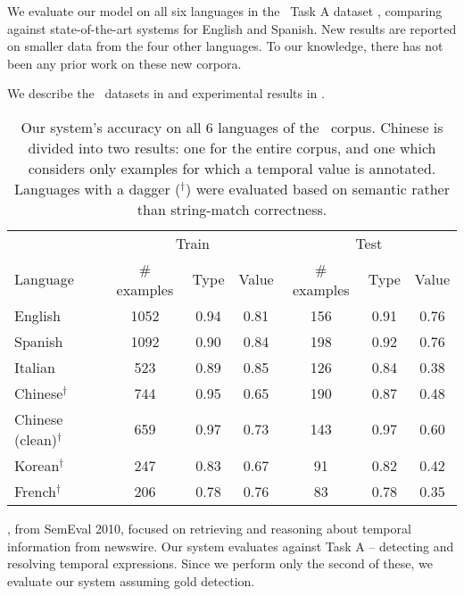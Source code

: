 We evaluate our model on all six languages in the \tempeval\ Task A dataset
  \cite{key:2010verhagen-tempeval}, comparing against state-of-the-art
  systems for English and Spanish.
New results are reported on smaller data from the four other languages.
To our knowledge, there has not been any prior work on these new corpora.

We describe the \tempeval\ datasets in  and experimental
  results in .


\begin{table*}[ht]
	\begin{center}
	\begin{tabular}{|l|c|c|c|c|c|c|}
		\hline
		       & \multicolumn{3}{c|}{Train} & \multicolumn{3}{c|}{Test} \\
		Language & \# examples & Type & Value  & \# examples & Type & Value \\
		\hline
		\hline
		English                        & 1052 & 0.94 & 0.81  & 156 & 0.91 & 0.76 \\
		Spanish                        & 1092 & 0.90 & 0.84  & 198 & 0.92 & 0.76 \\
		Italian                        & 523  & 0.89 & 0.85  & 126 & 0.84 & 0.38 \\
		Chinese$^\dagger$              & 744  & 0.95 & 0.65  & 190 & 0.87 & 0.48 \\
		Chinese (clean)$^\dagger$      & 659  & 0.97 & 0.73  & 143 & 0.97 & 0.60 \\
		Korean$^\dagger$               & 247  & 0.83 & 0.67  & 91  & 0.82 & 0.42 \\
		French$^\dagger$               & 206  & 0.78 & 0.76  & 83  & 0.78 & 0.35 \\
		\hline
	\end{tabular}
	\caption{
    Our system's accuracy on all 6 languages of the \tempeval\ corpus.
    Chinese is divided into two results: one for the entire corpus, and one
      which considers only examples for which a temporal value is annotated.
    Languages with a dagger ($^\dagger$) were evaluated based on semantic
      rather than string-match correctness.
		\label{tab:results-all}
	}
	\end{center}
\end{table*}

\tempeval, from SemEval 2010, focused on retrieving and reasoning
  about temporal information from newswire.
Our system evaluates against Task A -- detecting and resolving temporal
  expressions.
Since we perform only the second of these, we evaluate our system
	assuming gold detection.

